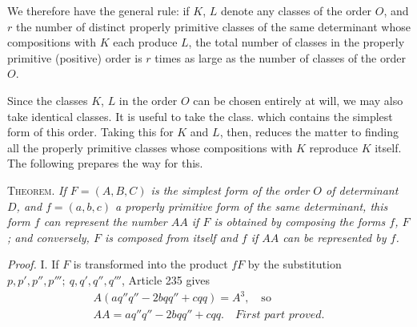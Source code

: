 We therefore have the general rule: if \(K\), \(L\) denote any classes of the order \(O\), and \(r\) the number of distinct properly primitive classes of the same determinant whose compositions with \(K\) each produce \(L\), the total number of classes in the properly primitive (positive) order is \(r\) times as large as the number of classes of the order \(O\).

Since the classes \(K\), \(L\) in the order \(O\) can be chosen entirely at will, we may also take identical classes. It is useful to take the class. which contains the simplest form of this order. Taking this for \(K\) and \(L\), then, reduces the matter to finding all the properly primitive classes whose compositions with \(K\) reproduce \(K\) itself. The following prepares the way for this.

\textsc{Theorem.} \textit{If \(F=(A,B,C)\) is the simplest form of the order \(O\) of determinant \(D\), and \(f=(a,b,c)\) a properly primitive form of the same determinant, this form \(f\) can represent the number \(AA\) if \(F\) is obtained by composing the forms \(f\), \(F\); and conversely, \(F\) is composed from itself and \(f\) if \(AA\) can be represented by \(f\).}

\textit{Proof.} I. If \(F\) is transformed into the product \(fF\) by the substitution \(p,\allowbreak p',\allowbreak p'',\allowbreak p''';\allowbreak \ q,\allowbreak q',\allowbreak q'',\allowbreak q'''\), Article 235 gives
\[
\begin{gathered}A(aq''q''-2bqq''+cqq)=A^3,\quad\text{so}\\ AA=aq''q''-2bqq''+cqq.\quad\textit{First part proved.}\end{gathered}
\]

